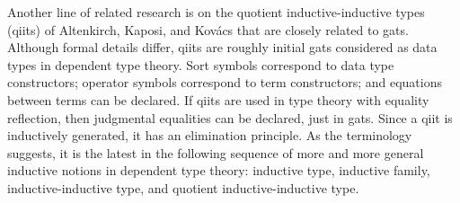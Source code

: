 \documentclass{easychair}
\begin{document}
Another line of related research is on the quotient inductive-inductive types (qiits) of Altenkirch, Kaposi, and Kov{\'{a}}cs \cite{altenkirch:qits,kaposi:qiits,kovacs:phd} that are closely related to gats. Although formal details differ, qiits are roughly initial gats considered as data types in dependent type theory. Sort symbols correspond to data type constructors; operator symbols correspond to term constructors; and equations between terms can be declared. If qiits are used in type theory with equality reflection, then judgmental equalities can be declared, just in gats. Since a qiit is inductively generated, it has an elimination principle. As the terminology suggests, it is the latest in the following sequence of more and more general inductive notions in dependent type theory: inductive type, inductive family, inductive-inductive type, and quotient inductive-inductive type.


%
%


\end{document}
